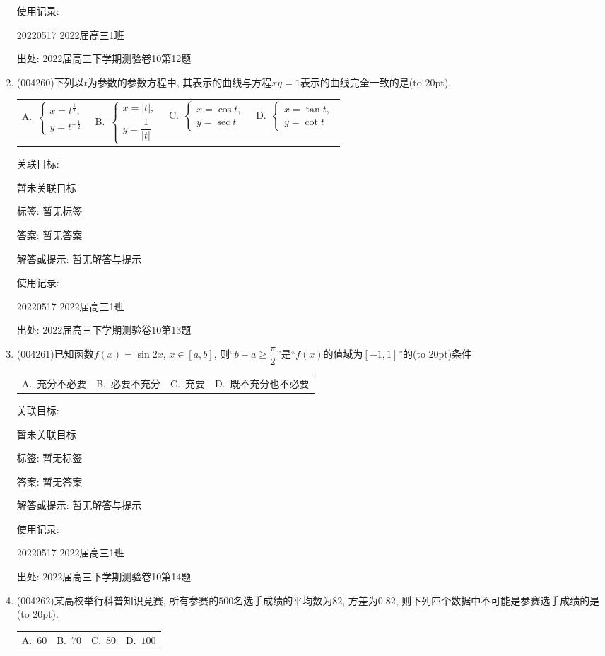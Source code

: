 \documentclass[10pt,a4paper]{article}
\newcommand{\bracket}[1]{(\hbox to #1pt{})}
\newcommand{\fourch}[4]{\par\begin{tabular}{p{.23\textwidth}p{.23\textwidth}p{.23\textwidth}p{.23\textwidth}}
A.~#1 &B.~#2& C.~#3& D.~#4
\end{tabular}}
\begin{document}
\begin{enumerate}[1.]
使用记录:

20220517	2022届高三1班	


出处: 2022届高三下学期测验卷10第12题
\item { (004260)}下列以$t$为参数的参数方程中, 其表示的曲线与方程$xy=1$表示的曲线完全一致的是\bracket{20}.
\fourch{$\begin{cases} x={t^{\frac 12}}, \\ y={t^{-\frac 12}} \end{cases}$}{$\begin{cases} x=|t|, \\ y=\dfrac 1{|t|} \end{cases}$}{$\begin{cases} x=\cos t, \\ y=\sec t \end{cases}$}{$\begin{cases}  x=\tan t, \\ y=\cot t \end{cases}$}


关联目标:

暂未关联目标



标签: 暂无标签

答案: 暂无答案

解答或提示: 暂无解答与提示

使用记录:

20220517	2022届高三1班	


出处: 2022届高三下学期测验卷10第13题
\item { (004261)}已知函数$f(x)=\sin 2x$, $x\in [a,b]$, 则``$b-a\ge \dfrac{\pi}2$''是``$f(x)$的值域为$[-1,1]$''的\bracket{20}条件
\fourch{充分不必要}{必要不充分}{充要}{既不充分也不必要}


关联目标:

暂未关联目标



标签: 暂无标签

答案: 暂无答案

解答或提示: 暂无解答与提示

使用记录:

20220517	2022届高三1班	


出处: 2022届高三下学期测验卷10第14题
\item { (004262)}某高校举行科普知识竞赛, 所有参赛的$500$名选手成绩的平均数为$82$, 方差为$0.82$, 则下列四个数据中不可能是参赛选手成绩的是\bracket{20}.
\fourch{$60$}{$70$}{$80$}{$100$}



\end{enumerate}
\end{document}
